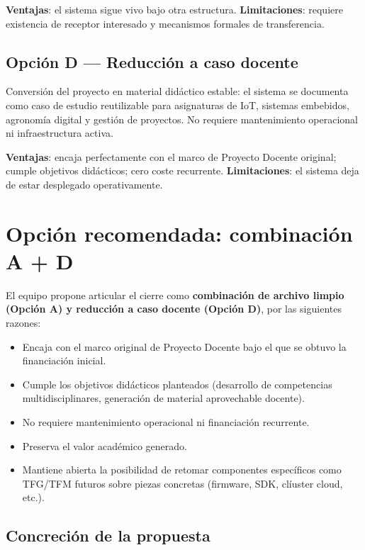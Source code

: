 \textbf{Ventajas}: el sistema sigue vivo bajo otra estructura.
\textbf{Limitaciones}: requiere existencia de receptor interesado y
mecanismos formales de transferencia.

\subsection*{Opci\'on D --- Reducci\'on a caso docente}

Conversi\'on del proyecto en material did\'actico estable: el sistema
se documenta como caso de estudio reutilizable para asignaturas de IoT,
sistemas embebidos, agronom\'ia digital y gesti\'on de proyectos. No
requiere mantenimiento operacional ni infraestructura activa.

\textbf{Ventajas}: encaja perfectamente con el marco de Proyecto
Docente original; cumple objetivos did\'acticos; cero coste recurrente.
\textbf{Limitaciones}: el sistema deja de estar desplegado
operativamente.

\section{Opci\'on recomendada: combinaci\'on A + D}
\label{sec:recomendacion}

El equipo propone articular el cierre como \textbf{combinaci\'on de
archivo limpio (Opci\'on A) y reducci\'on a caso docente (Opci\'on D)},
por las siguientes razones:

\begin{itemize}[leftmargin=*]
    \item Encaja con el marco original de Proyecto Docente bajo el que
    se obtuvo la financiaci\'on inicial.
    \item Cumple los objetivos did\'acticos planteados (desarrollo de
    competencias multidisciplinares, generaci\'on de material
    aprovechable docente).
    \item No requiere mantenimiento operacional ni financiaci\'on
    recurrente.
    \item Preserva el valor acad\'emico generado.
    \item Mantiene abierta la posibilidad de retomar componentes
    espec\'ificos como TFG/TFM futuros sobre piezas concretas
    (firmware, SDK, cl\'iuster cloud, etc.).
\end{itemize}

\subsection{Concreci\'on de la propuesta}

